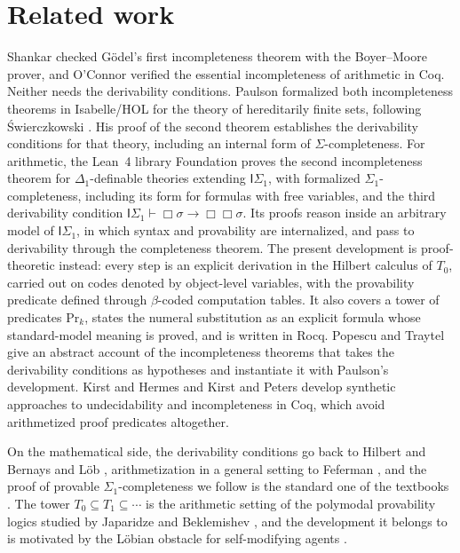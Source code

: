 \documentclass[11pt]{article}
\theoremstyle{plain}
\theoremstyle{definition}
\theoremstyle{remark}
\newcommand{\T}[1]{T_{#1}}
\newcommand{\Prv}{\mathrm{Pr}}
\begin{document}
\section{Related work}\label{sec:related}

Shankar \cite{Shankar1994} checked G\"odel's first incompleteness
theorem with the Boyer--Moore prover, and O'Connor
\cite{OConnor2005} verified the essential incompleteness of arithmetic
in Coq.  Neither needs the derivability conditions.  Paulson
\cite{Paulson2014,Paulson2015} formalized both incompleteness theorems
in Isabelle/HOL for the theory of hereditarily finite sets, following
{\'S}wierczkowski \cite{Swierczkowski2003}.  His proof of the second
theorem establishes the derivability conditions for that theory,
including an internal form of $\Sigma$-completeness.  For arithmetic,
the Lean~4 library Foundation \cite{Foundation} proves the second
incompleteness theorem for $\Delta_1$-definable theories extending
$\mathsf{I}\Sigma_1$, with formalized $\Sigma_1$-completeness, including
its form for formulas with free variables, and the third derivability
condition $\mathsf{I}\Sigma_1 \vdash \Box\sigma \to \Box\Box\sigma$.
Its proofs reason inside an arbitrary model of $\mathsf{I}\Sigma_1$, in
which syntax and provability are internalized, and pass to derivability
through the completeness theorem.  The present development is
proof-theoretic instead: every step is an explicit derivation in the
Hilbert calculus of $\T0$, carried out on codes denoted by object-level
variables, with the provability predicate defined through
$\beta$-coded computation tables.  It also covers a tower of predicates
$\Prv_k$, states the numeral substitution as an explicit formula whose
standard-model meaning is proved, and is written in Rocq.  Popescu and
Traytel
\cite{PopescuTraytel2019} give an abstract account of the incompleteness
theorems that takes the derivability conditions as hypotheses and
instantiate it with Paulson's development.  Kirst and Hermes
\cite{KirstHermes2021} and Kirst and Peters \cite{KirstPeters2023}
develop synthetic approaches to undecidability and incompleteness in
Coq, which avoid arithmetized proof predicates altogether.

On the mathematical side, the derivability conditions go back to
Hilbert and Bernays \cite{HilbertBernays1939} and L\"ob
\cite{Loeb1955}, arithmetization in a general setting to Feferman
\cite{Feferman1960}, and the proof of provable $\Sigma_1$-completeness
we follow is the standard one of the textbooks
\cite{Boolos1993,Smorynski1985,HajekPudlak1993}.  The tower
$\T0 \subseteq \T1 \subseteq \cdots$ is the arithmetic setting of the
polymodal provability logics studied by Japaridze and Beklemishev
\cite{Beklemishev2005}, and the development it belongs to is motivated
by the L\"obian obstacle for self-modifying agents
\cite{YudkowskyHerreshoff2013}.
\end{document}
